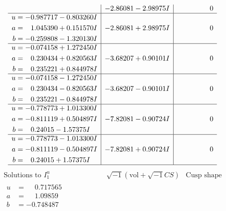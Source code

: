 \documentclass[1p]{elsarticle_modified}
\theoremstyle{definition}
\newcommand{\I}{\sqrt{-1}}
\begin{document}
$$\begin{array}{c|c|c}
 & -2.86081 - 2.98975 I & \phantom{-0.000000 } 0 \\ \hline\begin{aligned}
u &= -0.987717 - 0.803260 I \\
a &= \phantom{-}1.045390 + 0.151570 I \\
b &= -0.259808 - 1.320130 I\end{aligned}
 & -2.86081 + 2.98975 I & \phantom{-0.000000 } 0 \\ \hline\begin{aligned}
u &= -0.074158 + 1.272450 I \\
a &= \phantom{-}0.230434 + 0.820563 I \\
b &= \phantom{-}0.235221 + 0.844978 I\end{aligned}
 & -3.68207 + 0.90101 I & \phantom{-0.000000 } 0 \\ \hline\begin{aligned}
u &= -0.074158 - 1.272450 I \\
a &= \phantom{-}0.230434 - 0.820563 I \\
b &= \phantom{-}0.235221 - 0.844978 I\end{aligned}
 & -3.68207 - 0.90101 I & \phantom{-0.000000 } 0 \\ \hline\begin{aligned}
u &= -0.778773 + 1.013300 I \\
a &= -0.811119 + 0.504897 I \\
b &= \phantom{-}0.24015 - 1.57375 I\end{aligned}
 & -7.82081 - 0.90724 I & \phantom{-0.000000 } 0 \\ \hline\begin{aligned}
u &= -0.778773 - 1.013300 I \\
a &= -0.811119 - 0.504897 I \\
b &= \phantom{-}0.24015 + 1.57375 I\end{aligned}
 & -7.82081 + 0.90724 I & \phantom{-0.000000 } 0\\
 \hline 
 \end{array}$$\newpage$$\begin{array}{c|c|c}  
\text{Solutions to }I^u_{1}& \I (\text{vol} + \sqrt{-1}CS) & \text{Cusp shape}\\
 \hline 
\begin{aligned}
u &= \phantom{-}0.717565\phantom{ +0.000000I} \\
a &= \phantom{-}1.09859\phantom{ +0.000000I} \\
b &= -0.748487\phantom{ +0.000000I}\end{aligned}

\end{array}$$
\end{document}
